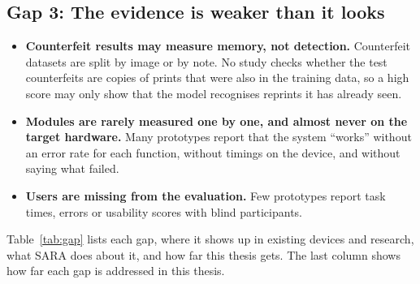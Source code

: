 \subsection*{Gap 3: The evidence is weaker than it looks}
\begin{itemize}[noitemsep]
    \item \textbf{Counterfeit results may measure memory, not detection.} Counterfeit datasets are split by image or by note. No study checks whether the test counterfeits are copies of prints that were also in the training data, so a high score may only show that the model recognises reprints it has already seen.
    \item \textbf{Modules are rarely measured one by one, and almost never on the target hardware.} Many prototypes report that the system ``works'' without an error rate for each function, without timings on the device, and without saying what failed.
    \item \textbf{Users are missing from the evaluation.} Few prototypes report task times, errors or usability scores with blind participants.
\end{itemize}

Table~\ref{tab:gap} lists each gap, where it shows up in existing devices and research, what SARA does about it, and how far this thesis gets. The last column shows how far each gap is addressed in this thesis.

